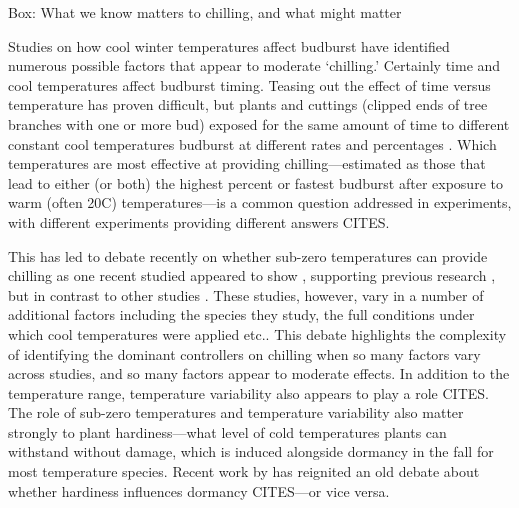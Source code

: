 \documentclass[11pt]{article}
\begin{document}
{\sc Box: What we know matters to chilling, and what might matter} %

Studies on how cool winter temperatures affect budburst have identified numerous possible factors that appear to moderate `chilling.' Certainly time and cool temperatures affect budburst timing. Teasing out the effect of time versus temperature has proven difficult, but plants and cuttings (clipped ends of tree branches with one or more bud) exposed for the same amount of time to different constant cool temperatures budburst at different rates and percentages \citep{ospreebbms,ospreenph2023}. Which temperatures are most effective at providing chilling---estimated as those that lead to either (or both) the highest percent or fastest budburst after exposure to warm (often 20\degree C) temperatures---is a common question addressed in experiments, with different experiments providing different answers CITES. 

This has led to debate recently on whether sub-zero temperatures can provide chilling as one recent studied appeared to show \citep{baum2021}, supporting previous research \citep{Jones:2012,Sonsteby:2014aa}, but in contrast to other studies \citep{lamb1948effect,cook2005freezing,Man:2010aa}. These studies, however, vary in a number of additional factors including the species they study, the full conditions under which cool temperatures were applied etc.. This debate highlights the complexity of identifying the dominant controllers on chilling when so many factors vary across studies, and so many factors appear to moderate effects. In addition to the temperature range, temperature variability also appears to play a role CITES. The role of sub-zero temperatures and temperature variability also matter strongly to plant hardiness---what level of cold temperatures plants can withstand without damage, which is induced alongside dormancy in the fall for most temperature species. Recent work by \citet{kovaleskipreprint} has reignited an old debate about whether hardiness influences dormancy CITES---or vice versa. 
\end{document}
